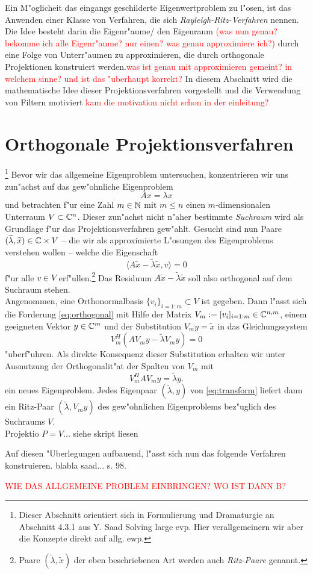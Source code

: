 Ein M"oglicheit das eingangs geschilderte Eigenwertproblem zu l"osen, ist
das Anwenden einer Klasse von Verfahren, die sich \emph{Rayleigh-Ritz-Verfahren}
nennen. Die Idee besteht darin die Eigenr"aume/ den Eigenraum \textcolor{red}{(was nun genau? bekomme ich alle
Eigenr"aume? nur einen? was genau approximiere ich?)} durch eine Folge von Unterr"aumen
zu approximieren, die durch orthogonale Projektionen konstruiert werden.\textcolor{red}{was ist genau
mit approximieren gemeint? in welchem sinne? und ist das "uberhaupt korrekt?} In diesem
Abschnitt wird die mathematische Idee dieser Projektionsverfahren vorgestellt und
die Verwendung von Filtern motiviert \textcolor{red}{kam die motivation nicht schon
in der einleitung?}

\section{Orthogonale Projektionsverfahren}
\footnote{Dieser Abschnitt orientiert sich in Formulierung und Dramaturgie an Abschnitt 4.3.1 aus Y. Saad Solving large evp. Hier verallgemeinern wir aber die Konzepte direkt auf allg. ewp.}
Bevor wir das allgemeine Eigenproblem untersuchen, konzentrieren wir uns zun"achst auf das gew"ohnliche Eigenproblem
\[
Ax = \lambda x%
\]
und betrachten f"ur eine Zahl $m\in\mathbb{N}$ mit $m\le n$
einen $m$-dimensionalen Unterraum $V\subset\mathbb{C}^n$. Dieser zun"achst nicht
n"aher bestimmte \emph{Suchraum} wird als Grundlage f"ur das Projektionsverfahren gew"ahlt.
Gesucht sind nun Paare $(\widetilde{\lambda}, \widetilde{x})\in\mathbb{C}\times V$ -- die wir als approximierte L"osungen des Eigenproblems verstehen wollen --
welche die Eigenschaft
\begin{equation}\label{eq:orthogonal}
\langle A\widetilde{x} - \widetilde{\lambda}\widetilde{x}, v\rangle=0
\end{equation}
f"ur alle $v\in V$ erf"ullen.\footnote{Paare $(\widetilde{\lambda}, \widetilde{x})$ der
eben beschriebenen Art werden auch \emph{Ritz-Paare} genannt.}
Das Residuum $A\widetilde{x} - \widetilde{\lambda}\widetilde{x}$
soll also orthogonal auf dem Suchraum stehen.\\%

Angenommen, eine Orthonormalbasis $\{v_i\}_{i=1:m}\subset V$ ist gegeben.
Dann l"asst sich die Forderung \eqref{eq:orthogonal} mit Hilfe der Matrix $V_m :=[v_i]_{i=1:m}\in\mathbb{C}^{n,m}$, einem geeigneten Vektor
$y\in\mathbb{C}^m$ und der Substitution $V_m y=\widetilde{x}$ in das Gleichungssystem
\[
V_m^H(AV_m y - \widetilde{\lambda} V_m y) = 0
\]
"uberf"uhren. Als direkte Konsequenz dieser Substitution erhalten wir unter Ausnutzung der Orthogonalit"at der Spalten von $V_m$ mit
\begin{equation}\label{eq:transform}
V_m^H A V_m y = \widetilde{\lambda}y.
\end{equation}
ein neues Eigenproblem. Jedes Eigenpaar $(\widetilde{\lambda},y)$ von \eqref{eq:transform}
liefert dann ein Ritz-Paar $(\widetilde{\lambda}, V_m y)$ des gew"ohnlichen
Eigenproblems bez"uglich des Suchraums $V$.\\

Projektio $P=V$... siehe skript liesen

Auf diesen "Uberlegungen aufbauend, l"asst sich nun das folgende Verfahren konstruieren.
blabla saad... s. 98.

\textcolor{red}{WIE DAS ALLGEMEINE PROBLEM EINBRINGEN? WO IST DANN B?}
